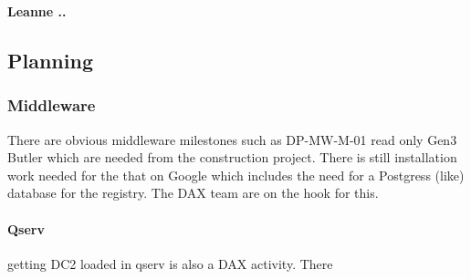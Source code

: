 {\bf Leanne .. }



\subsection{Planning}

\subsubsection{Middleware}
There are obvious middleware milestones such as DP-MW-M-01 read only Gen3 Butler which are needed from the construction project.
There is still installation work needed for the that on Google which includes the need for a Postgress (like) database for the registry. The DAX team are on the hook for this.

\paragraph{Qserv} getting DC2 loaded in qserv is also a DAX activity. There



